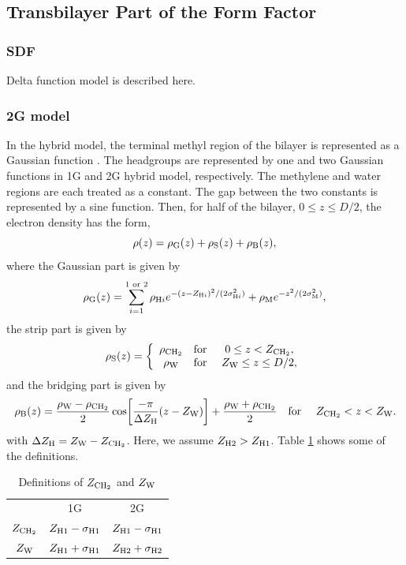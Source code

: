 \subsection{Transbilayer Part of the Form Factor}
\subsubsection{SDF}
Delta function model is described here.

\subsubsection{2G model}
In the hybrid model, the terminal methyl region of the bilayer is represented
as a Gaussian function \cite{ref:Wiener89}. The headgroups are represented by one 
and two Gaussian
functions in 1G and 2G hybrid model, respectively. The methylene and water 
regions are each treated as a constant. The gap between the two constants is 
represented by a sine function. Then, for half of the bilayer, 
$0 \leq z \leq D/2$, the electron density has the form, 
\begin{equation}
  \rho(z) = \rho_\mathrm{G}(z) + \rho_\mathrm{S}(z) + \rho_\mathrm{B}(z),
\end{equation}
where the Gaussian part is given by 
\begin{equation}
  \rho_\mathrm{G}(z) = \sum_{i=1}^{1\text{ or }2} \rho_{\mathrm{H}i}
             e^{-(z-Z_{\mathrm{H}i})^2/(2\sigma_{\mathrm{H}i}^2)} + \rho_\mathrm{M} e^{-z^2/(2\sigma_\mathrm{M}^2)},
\end{equation}
the strip part is given by
\begin{equation}
  \rho_\mathrm{S}(z) = \left\{
    \begin{array}{ccc}
      \rho_\mathrm{CH_2} & \text{for } & 0 \leq z < Z_\mathrm{CH_2}, \\
      \rho_\mathrm{W}   & \text{for } & Z_\mathrm{W} \leq z \leq D/2,
    \end{array}
  \right.
\end{equation}
and the bridging part is given by
\begin{equation}
  \rho_\mathrm{B}(z) = \frac{\rho_\mathrm{W}-\rho_\mathrm{CH_2}}{2} \cos \mathopen{}\left[ 
    \frac{-\pi}{\Delta Z_\mathrm{H}}(z-Z_\mathrm{W}) \right]\mathclose{} + \frac{\rho_\mathrm{W}+\rho_\mathrm{CH_2}}{2} \\
  \text{\quad for \quad} Z_\mathrm{CH_2} < z < Z_\mathrm{W}.
\end{equation}
with $\Delta Z_\mathrm{H}=Z_\mathrm{W}-Z_\mathrm{CH_2}$. Here, we assume $Z_{\mathrm{H}2}>Z_{\mathrm{H}1}$. 
Table \ref{tb:zchtwozw} shows some of the definitions.
\begin{table}[htb]
  \centering
  \begin{tabular}{c c c}
     & 1G & 2G \\
    $Z_\mathrm{CH_2}$ & $Z_{\mathrm{H}1}-\sigma_{\mathrm{H}1}$ & $Z_{\mathrm{H}1}-\sigma_{\mathrm{H}1}$ \\
    $Z_\mathrm{W}$ & $Z_{\mathrm{H}1}+\sigma_{\mathrm{H}1}$ & $Z_{\mathrm{H}2}+\sigma_{\mathrm{H}2}$   
  \end{tabular}
  \caption{Definitions of $Z_\mathrm{CH_2}$ and $Z_\mathrm{W}$}
  \label{tb:zchtwozw}
\end{table}
